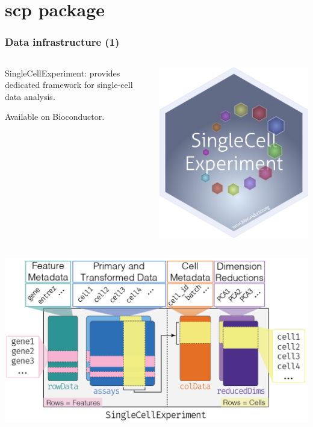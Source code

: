 \documentclass{beamer}
\newcommand{\frametitlesection}[1]{\frametitle{\centering #1 \footnotesize \hspace{0pt plus 1 filll} \insertsection}}
\begin{document}

\section{scp package}

\begin{frame}
    \frametitlesection{Data infrastructure (1)}
    \begin{columns}
        \begin{column}{0.8\textwidth}
            SingleCellExperiment: provides dedicated framework for single-cell 
            data analysis. 
            
            Available on Bioconductor.
        \end{column}
        \begin{column}{0.2\textwidth}
            \includegraphics[width=\linewidth]{figs/sticker_SingleCellExperiment.png}
        \end{column}  
    \end{columns}
    
    \includegraphics[width=0.9\linewidth]{figs/SingleCellExperiment.png}
    

\end{frame}
\end{document}
